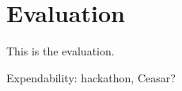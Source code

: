 \chapter{Evaluation}
\label{cha:evaluation}

This is the evaluation.


Expendability: hackathon, Ceasar?
